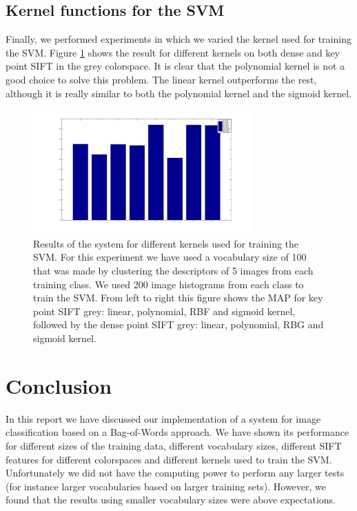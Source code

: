 \documentclass[11pt]{article}
\begin{document}
\subsection{Kernel functions for the SVM}
Finally, we performed experiments in which we varied the kernel used for training the SVM. Figure \ref{kernels} shows the result for different kernels on both dense and key point SIFT in the grey colorspace. It is clear that the polynomial kernel is not a good choice to solve this problem. The linear kernel outperforms the rest, although it is really similar to both the polynomial kernel and the sigmoid kernel.  
\begin{figure}[H]
  \centering
    \includegraphics[width=0.75\textwidth]{greyKernels}
      \caption{Results of the system for different kernels used for training the SVM. For this experiment we have used a vocabulary size of 100 that was made by clustering the descriptors of 5 images from each training class. We used 200 image histograms from each class to train the SVM. From left to right this figure shows the MAP for key point SIFT grey: linear, polynomial, RBF and sigmoid kernel, followed by the dense point SIFT grey: linear, polynomial, RBG and sigmoid kernel. }
      \label{kernels}
\end{figure}

\section{Conclusion}
In this report we have discussed our implementation of a system for image classification based on a Bag-of-Words approach. We have shown its performance for different sizes of the training data, different vocabulary sizes, different SIFT features for different colorspaces and different kernels used to train the SVM. Unfortunately we did not have the computing power to perform any larger tests (for instance larger vocabularies based on larger training sets). However, we found that the results using smaller vocabulary sizes were above expectations. 
\end{document}
